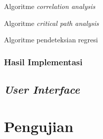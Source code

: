 \begin{algorithm}[hbt!]
	
	\caption{Algoritme \textit{correlation analysis}}\label{alg:corr-analysis}
\end{algorithm}

\begin{algorithm}[hbt!]
	
	\caption{Algoritme \textit{critical path analysis}}\label{alg:crit-analysis}
\end{algorithm}

\begin{algorithm}[hbt!]
		
	
	\caption{Algoritme pendeteksian regresi}\label{alg:reg-detection}
\end{algorithm}








\subsubsection{Hasil Implementasi}

\subsection{\textit{User Interface}}


\section{Pengujian}
